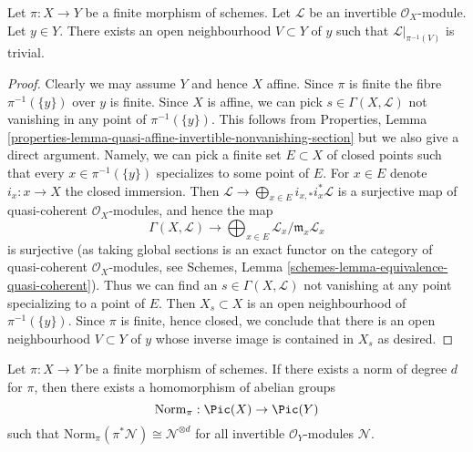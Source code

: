 \begin{lemma}
\label{lemma-finite-trivialize-invertible-upstairs}
Let $\pi : X \to Y$ be a finite morphism of schemes.
Let $\mathcal{L}$ be an invertible $\mathcal{O}_X$-module.
Let $y \in Y$. There exists an open neighbourhood
$V \subset Y$ of $y$ such that $\mathcal{L}|_{\pi^{-1}(V)}$ is trivial.
\end{lemma}

\begin{proof}
Clearly we may assume $Y$ and hence $X$ affine. Since $\pi$ is finite the
fibre $\pi^{-1}(\{y\})$ over $y$ is finite.
Since $X$ is affine, we can pick $s \in \Gamma(X, \mathcal{L})$
not vanishing in any point of $\pi^{-1}(\{y\})$. This follows
from Properties, Lemma
\ref{properties-lemma-quasi-affine-invertible-nonvanishing-section}
but we also give a direct argument. Namely, we can
pick a finite set $E \subset X$ of closed points such that
every $x \in \pi^{-1}(\{y\})$ specializes to some point of $E$.
For $x \in E$ denote $i_x : x \to X$ the closed immersion.
Then
$\mathcal{L} \to \bigoplus_{x \in E} i_{x, *}i_x^*\mathcal{L}$
is a surjective map of quasi-coherent $\mathcal{O}_X$-modules,
and hence the map
$$
\Gamma(X, \mathcal{L}) \to
\bigoplus\nolimits_{x \in E} \mathcal{L}_x/\mathfrak m_x\mathcal{L}_x
$$
is surjective (as taking global sections is an exact functor on the
category of quasi-coherent $\mathcal{O}_X$-modules, see
Schemes, Lemma \ref{schemes-lemma-equivalence-quasi-coherent}).
Thus we can find an $s \in \Gamma(X, \mathcal{L})$
not vanishing at any point specializing to a point of $E$.
Then $X_s \subset X$ is an open neighbourhood of $\pi^{-1}(\{y\})$.
Since $\pi$ is finite, hence closed, we conclude that there is an
open neighbourhood $V \subset Y$ of $y$ whose inverse image
is contained in $X_s$ as desired.
\end{proof}

\begin{lemma}
\label{lemma-norm-invertible}
Let $\pi : X \to Y$ be a finite morphism of schemes. If there exists
a norm of degree $d$ for $\pi$, then there exists a homomorphism of
abelian groups
$$
\text{Norm}_\pi : \Pic(X) \to \Pic(Y)
$$
such that $\text{Norm}_\pi(\pi^*\mathcal{N}) \cong \mathcal{N}^{\otimes d}$
for all invertible $\mathcal{O}_Y$-modules $\mathcal{N}$.
\end{lemma}

